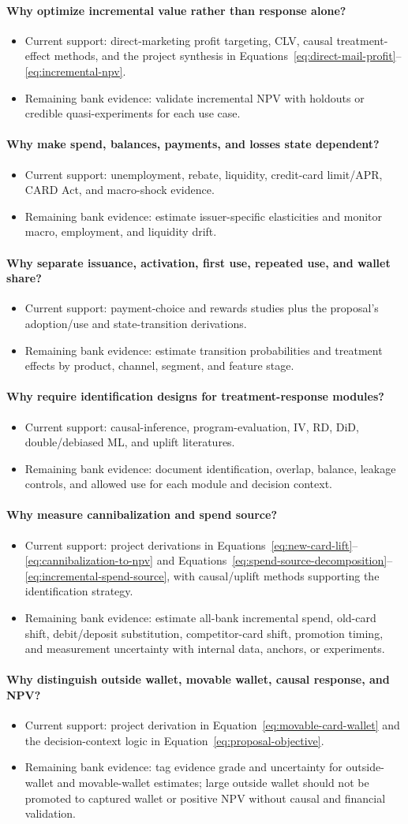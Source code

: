 \documentclass[11pt]{article}
\newcommand{\1}{\mathbf{1}}
\newcommand{\contractitem}[2]{\paragraph{#1}\begin{itemize}[leftmargin=1.5em,itemsep=0.12em,topsep=0.18em]#2\end{itemize}}
\begin{document}
\contractitem{Why optimize incremental value rather than response alone?}{
  \item Current support: direct-marketing profit targeting, CLV, causal
        treatment-effect methods, and the project synthesis in
        Equations~\eqref{eq:direct-mail-profit}--\eqref{eq:incremental-npv}.
  \item Remaining bank evidence: validate incremental NPV with holdouts or
        credible quasi-experiments for each use case.
}
\contractitem{Why make spend, balances, payments, and losses state dependent?}{
  \item Current support: unemployment, rebate, liquidity, credit-card
        limit/APR, CARD Act, and macro-shock evidence.
  \item Remaining bank evidence: estimate issuer-specific elasticities and
        monitor macro, employment, and liquidity drift.
}
\contractitem{Why separate issuance, activation, first use, repeated use, and wallet share?}{
  \item Current support: payment-choice and rewards studies plus the proposal's
        adoption/use and state-transition derivations.
  \item Remaining bank evidence: estimate transition probabilities and
        treatment effects by product, channel, segment, and feature stage.
}
\contractitem{Why require identification designs for treatment-response modules?}{
  \item Current support: causal-inference, program-evaluation, IV, RD, DiD,
        double/debiased ML, and uplift literatures.
  \item Remaining bank evidence: document identification, overlap, balance,
        leakage controls, and allowed use for each module and decision context.
}
\contractitem{Why measure cannibalization and spend source?}{
  \item Current support: project derivations in
        Equations~\eqref{eq:new-card-lift}--\eqref{eq:cannibalization-to-npv}
        and
        Equations~\eqref{eq:spend-source-decomposition}--\eqref{eq:incremental-spend-source},
        with causal/uplift methods supporting the identification strategy.
  \item Remaining bank evidence: estimate all-bank incremental spend, old-card
        shift, debit/deposit substitution, competitor-card shift, promotion
        timing, and measurement uncertainty with internal data, anchors, or
        experiments.
}
\contractitem{Why distinguish outside wallet, movable wallet, causal response, and NPV?}{
  \item Current support: project derivation in
        Equation~\eqref{eq:movable-card-wallet} and the decision-context logic
        in Equation~\eqref{eq:proposal-objective}.
  \item Remaining bank evidence: tag evidence grade and uncertainty for
        outside-wallet and movable-wallet estimates; large outside wallet
        should not be promoted to captured wallet or positive NPV without
        causal and financial validation.
}
\end{document}
